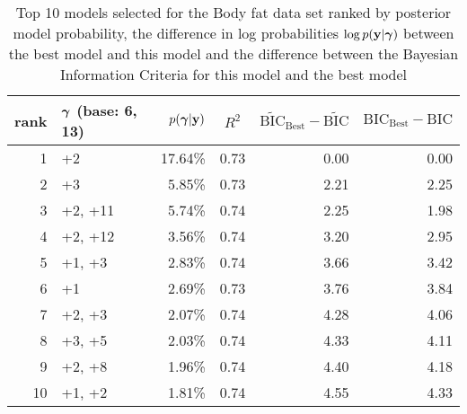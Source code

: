 \documentclass{article}[12pt]
\begin{document}
\begin{table}
	\label{tab:numerical_results_bodyfat}
	\caption{Top 10 models selected for the Body fat data set ranked by posterior model probability, the difference
		in log probabilities $\log p({\bf y}|{\boldsymbol \gamma})$ between the best model and this model and the difference
		between the Bayesian Information Criteria for this model and the best model}
	\begin{center}
		\begin{tabular}{r|l|r|c|r|r}
			rank & ${\boldsymbol \gamma}$ (base: 6, 13) & $p({\boldsymbol \gamma}|{\bf y})$ & $R^2$ & $\widetilde{\text{BIC}}_\text{Best} - \widetilde{\text{BIC}}$ & $\text{BIC}_\text{Best} - \text{BIC}$ \\
			\hline
			1  &  +2&  17.64\%&  0.73&  0.00&  0.00\\
			2 &  +3&  5.85\%&  0.73&  2.21&  2.25\\
			3 &  +2, +11&  5.74\%&  0.74&  2.25&  1.98\\
			4 &  +2, +12&  3.56\%&  0.74&  3.20&  2.95\\
			5 &  +1, +3&  2.83\%&  0.74&  3.66&  3.42\\
			6 &  +1&  2.69\%&  0.73&  3.76&  3.84\\
			7 &  +2, +3&  2.07\%&  0.74&  4.28&  4.06\\
			8 &  +3, +5&  2.03\%&  0.74&  4.33&  4.11\\
			9 &  +2, +8&  1.96\%&  0.74&  4.40&  4.18\\
			10 &  +1, +2&  1.81\%&  0.74&  4.55&  4.33\\
		\end{tabular}
	\end{center}
\end{table}
\end{document}
